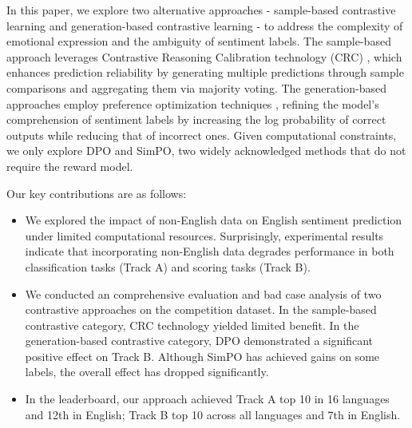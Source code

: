 \documentclass[11pt]{article}
\begin{document}

In this paper, we explore two alternative approaches - sample-based contrastive learning and generation-based contrastive learning - to address the complexity of emotional expression and the ambiguity of sentiment labels. The sample-based approach leverages Contrastive Reasoning Calibration technology (CRC) \cite{li2024chinchunmei}, which enhances prediction reliability by generating multiple predictions through sample comparisons and aggregating them via majority voting. The generation-based approaches employ preference optimization techniques \cite{rafailov2023direct, hong2024orpo, meng2025simpo}, refining the model’s comprehension of sentiment labels by increasing the log probability of correct outputs while reducing that of incorrect ones. Given computational constraints, we only explore DPO \cite{rafailov2023direct} and SimPO\cite{meng2025simpo}, two widely acknowledged methods that do not require the reward model.



Our key contributions are as follows:

\begin{itemize}
	\item We explored the impact of non-English data on English sentiment prediction under limited computational resources. Surprisingly, experimental results indicate that incorporating non-English data degrades performance in both classification tasks (Track A) and scoring tasks (Track B).
	\item We conducted an comprehensive evaluation and bad case analysis of two contrastive approaches on the competition dataset. In the sample-based contrastive category, CRC technology yielded limited benefit. In the generation-based contrastive category, DPO demonstrated a significant positive effect on Track B. Although SimPO has achieved gains on some labels, the overall effect has dropped significantly. 
	\item In the leaderboard, our approach achieved Track A top 10 in 16 languages and 12th in English; Track B top 10 across all languages and 7th in English.
\end{itemize}
\end{document}
